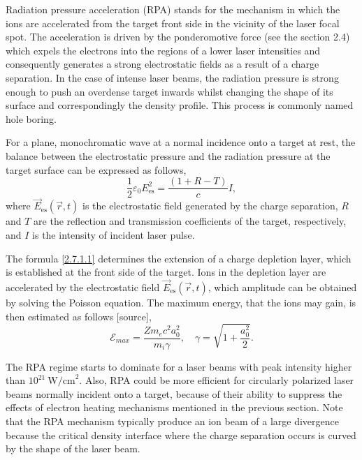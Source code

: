 Radiation pressure acceleration (RPA) stands for the mechanism in which the ions are accelerated from the target front side in the vicinity of the laser focal spot. The acceleration is driven by the ponderomotive force (see the section 2.4) which expels the electrons into the regions of a lower laser intensities and consequently generates a strong electrostatic fields as a result of a charge separation. In the case of intense laser beams, the radiation pressure is strong enough to push an overdense target inwards whilst changing the shape of its surface and correspondingly the density profile. This process is commonly named hole boring.

For a plane, monochromatic wave at a normal incidence onto a target at rest, the balance between the electrostatic pressure and the radiation pressure at the target surface can be expressed as follows,
\begin{equation}
\label{2.7.1.1}
\frac{1}{2} \varepsilon_0 E_{\mathrm{es}}^2 = \frac{\left( 1 + R - T \right)}{c} I,
\end{equation}
where $ \vec{E}_{\mathrm{es}} \left(\vec{r}, t \right) $ is the electrostatic field generated by the charge separation, $ R $ and $ T $ are the reflection and transmission coefficients of the target, respectively, and $ I $ is the intensity of incident laser pulse.

The formula \ref{2.7.1.1} determines the extension of a charge depletion layer, which is established at the front side of the target. Ions in the depletion layer are accelerated by the electrostatic field $ \vec{E}_{\mathrm{es}} \left(\vec{r}, t \right) $, which amplitude can be obtained by solving the Poisson equation. The maximum energy, that the ions may gain, is then estimated as follows [source],
\begin{equation}
\mathcal{E}_{max} = \frac{Z m_e c^2 a_0^2}{m_i \gamma}, \quad \gamma = \sqrt{1 + \frac{a_0^2}{2}}.
\end{equation}
 
The RPA regime starts to dominate for a laser beams with peak intensity higher than $ 10^{21} \  \mathrm{W/cm}^2 $. Also, RPA could be more efficient for circularly polarized laser beams normally incident onto a target, because of their ability to suppress the effects of electron heating mechanisms mentioned in the previous section. Note that the RPA mechanism typically produce an ion beam of a large divergence because the critical density interface where the charge separation occurs is curved by the shape of the laser beam.

